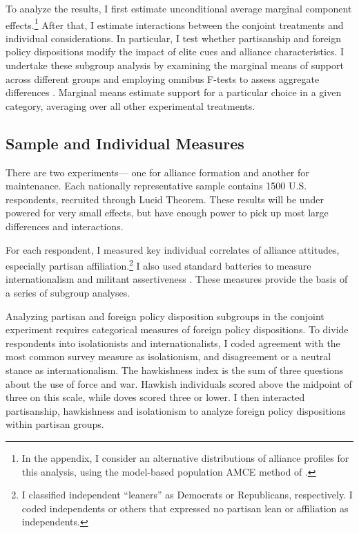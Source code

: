 \documentclass[12pt]{article}
\begin{document}
To analyze the results, I first estimate unconditional average marginal component effects.\footnote{In the appendix, I consider an alternative distributions of alliance profiles for this analysis, using the model-based population AMCE method of \citet{delaCuestaetal2021}.}
After that, I estimate interactions between the conjoint treatments and individual considerations.
In particular, I test whether partisanship and foreign policy dispositions modify the impact of elite cues and alliance characteristics. 
I undertake these subgroup analysis by examining the marginal means of support across different groups and employing omnibus F-tests to assess aggregate differences \citep{Leeperetal2020}. 
Marginal means estimate support for a particular choice in a given category, averaging over all other experimental treatments. 



\subsection{Sample and Individual Measures}


There are two experiments--- one for alliance formation and another for maintenance. 
Each nationally representative sample contains 1500 U.S. respondents, recruited through Lucid Theorem.
These results will be under powered for very small effects, but have enough power to pick up most large differences and interactions. 


For each respondent, I measured key individual correlates of alliance attitudes, especially partisan affiliation.\footnote{I classified independent ``leaners'' as Democrats or Republicans, respectively. I coded independents or others that expressed no partisan lean or affiliation as independents.}
I also used standard batteries to measure internationalism and militant assertiveness \citep{Herrmannetal1999, KertzerBrutger2016}.
These measures provide the basis of a series of subgroup analyses. 


Analyzing partisan and foreign policy disposition subgroups in the conjoint experiment requires categorical measures of foreign policy dispositions. 
To divide respondents into isolationists and internationalists, I coded agreement with the most common survey measure as isolationism, and disagreement or a neutral stance as internationalism. 
The hawkishness index is the sum of three questions about the use of force and war. 
Hawkish individuals scored above the midpoint of three on this scale, while doves scored three or lower. 
I then interacted partisanship, hawkishness and isolationism to analyze foreign policy dispositions within partisan groups.
\end{document}

